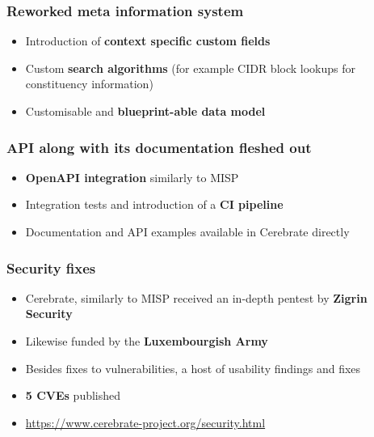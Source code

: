 \begin{frame}
  \frametitle{Reworked meta information system}
  \begin{itemize}
     \item Introduction of {\bf context specific custom fields}
     \item Custom {\bf search algorithms} (for example CIDR block lookups for constituency information)
     \item Customisable and {\bf blueprint-able data model}
  \end{itemize}
\end{frame}

\begin{frame}
  \frametitle{API along with its documentation fleshed out}
  \begin{itemize}
     \item {\bf OpenAPI integration} similarly to MISP
     \item Integration tests and introduction of a {\bf CI pipeline}
     \item Documentation and API examples available in Cerebrate directly
  \end{itemize}
\end{frame}

\begin{frame}
  \frametitle{Security fixes}
  \begin{itemize}
     \item Cerebrate, similarly to MISP received an in-depth pentest by {\bf Zigrin Security}
     \item Likewise funded by the {\bf Luxembourgish Army}
     \item Besides fixes to vulnerabilities, a host of usability findings and fixes
     \item {\bf 5 CVEs} published
     \item \url{https://www.cerebrate-project.org/security.html}
  \end{itemize}
\end{frame}

